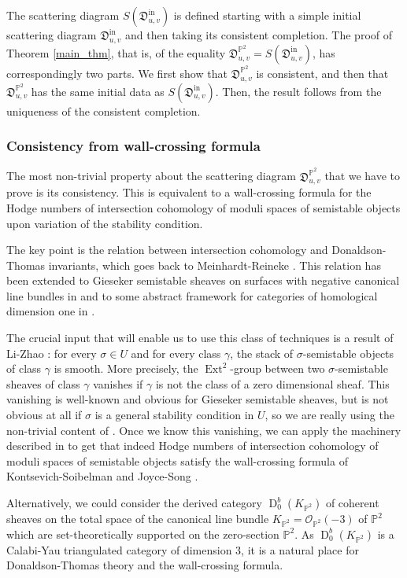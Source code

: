 \documentclass[12pt, a4paper]{amsart}
\newcommand\PP{\mathbb P}
\newcommand\cO{\mathcal O}
\newcommand\fD{\mathfrak D}
\newcommand\Ext{\operatorname{Ext}}
\newcommand\D{\operatorname{D}}
\newcommand\iin{\mathrm{in}}
\begin{document}
The scattering diagram $S(\fD^\iin_{u,v})$ is defined starting with a simple initial scattering diagram $\fD^\iin_{u,v}$ and then taking its consistent completion. The proof of Theorem \ref{main_thm}, that is, of the equality $\fD^{\PP^2}_{u,v}=S(\fD^\iin_{u,v})$, has correspondingly two parts.
We first show that $\fD^{\PP^2}_{u,v}$ is consistent, and then that $\fD^{\PP^2}_{u,v}$ has the same initial data as
$S(\fD^\iin_{u,v})$. Then, the result follows from the uniqueness of the consistent completion.

\subsubsection{Consistency from wall-crossing formula}
The most non-trivial property about 
the scattering diagram $\fD^{\PP^2}_{u,v}$ that we have to prove is its consistency. This is equivalent to a wall-crossing formula for the Hodge numbers of intersection cohomology of moduli spaces of semistable objects upon variation of the stability condition. 

The key point is the relation between intersection cohomology and Donaldson-Thomas invariants, which goes back to Meinhardt-Reineke \cite{meinhardt2017donaldson}.
This relation has been extended to Gieseker semistable sheaves on surfaces with negative canonical line bundles in 
\cite{MR3874687} and to some abstract 
framework for categories of homological dimension one in \cite{meinhardt2015donaldson}.

The crucial input that will enable us to use this class of techniques is a result of Li-Zhao \cite{MR3936077}:
for every $\sigma \in U$ and for every class $\gamma$, the stack of $\sigma$-semistable objects of class $\gamma$ is smooth. More precisely, 
the $\Ext^2$-group between two $\sigma$-semistable sheaves of class $\gamma$ vanishes if
$\gamma$ is not the class of a zero dimensional sheaf. This vanishing is well-known and obvious for Gieseker semistable sheaves, but is not obvious at all if $\sigma$ is a general stability condition in $U$, so we are really using the non-trivial content of \cite{MR3936077}. Once we know this vanishing, we can apply the machinery described in \cite{meinhardt2015donaldson}
to get that indeed Hodge numbers of intersection cohomology of moduli spaces of semistable objects satisfy the wall-crossing formula of 
Kontsevich-Soibelman
\cite{kontsevich2008stability} 
and Joyce-Song \cite{MR2951762}.

Alternatively, we could consider the derived category $\D^b_0(K_{\PP^2})$ of coherent sheaves on the total space of the canonical line bundle $K_{\PP^2}=\cO_{\PP^2}(-3)$ of $\PP^2$ which are set-theoretically supported on the zero-section $\PP^2$. As $\D^b_0(K_{\PP^2})$ is a Calabi-Yau triangulated category of dimension $3$, it is a natural place for Donaldson-Thomas theory and the wall-crossing formula. 
\end{document}
